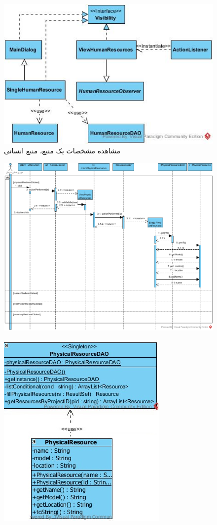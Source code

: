 \begin{landscape}
\begin{figure}[H]
	\includegraphics[scale=0.6]{img/sequence-design/ViewResourceAttributes_HUMANUI}
	\caption{مشاهده مشخصات یک منبع، منبع انسانی}
\end{figure}
\begin{figure}[H]
	\centering
	\includegraphics[scale=0.8]{img/sequence-design/ViewResourceAttributes_PHYSICAL}
\end{figure}
\begin{figure}[H]
	\centering
	\includegraphics[scale=0.6]{img/sequence-design/ViewResourceAttributes_PHYSICALC}

\end{figure}
\end{landscape}
